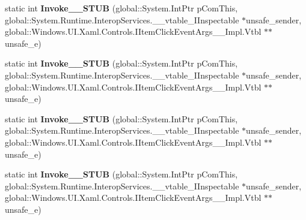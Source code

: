 \begin{DoxyCompactItemize}
\item 
\mbox{\label{struct_windows_1_1_u_i_1_1_xaml_1_1_controls_1_1_item_click_event_handler_____impl_1_1_vtbl_adfcdf0da029e56f3f474a6e2beca6f9c}} 
static int {\bfseries Invoke\+\_\+\+\_\+\+S\+T\+UB} (global\+::\+System.\+Int\+Ptr p\+Com\+This, global\+::\+System.\+Runtime.\+Interop\+Services.\+\_\+\+\_\+vtable\+\_\+\+I\+Inspectable $\ast$unsafe\+\_\+sender, global\+::\+Windows.\+U\+I.\+Xaml.\+Controls.\+I\+Item\+Click\+Event\+Args\+\_\+\+\_\+\+Impl.\+Vtbl $\ast$$\ast$unsafe\+\_\+e)
\item 
\mbox{\label{struct_windows_1_1_u_i_1_1_xaml_1_1_controls_1_1_item_click_event_handler_____impl_1_1_vtbl_adfcdf0da029e56f3f474a6e2beca6f9c}} 
static int {\bfseries Invoke\+\_\+\+\_\+\+S\+T\+UB} (global\+::\+System.\+Int\+Ptr p\+Com\+This, global\+::\+System.\+Runtime.\+Interop\+Services.\+\_\+\+\_\+vtable\+\_\+\+I\+Inspectable $\ast$unsafe\+\_\+sender, global\+::\+Windows.\+U\+I.\+Xaml.\+Controls.\+I\+Item\+Click\+Event\+Args\+\_\+\+\_\+\+Impl.\+Vtbl $\ast$$\ast$unsafe\+\_\+e)
\item 
\mbox{\label{struct_windows_1_1_u_i_1_1_xaml_1_1_controls_1_1_item_click_event_handler_____impl_1_1_vtbl_adfcdf0da029e56f3f474a6e2beca6f9c}} 
static int {\bfseries Invoke\+\_\+\+\_\+\+S\+T\+UB} (global\+::\+System.\+Int\+Ptr p\+Com\+This, global\+::\+System.\+Runtime.\+Interop\+Services.\+\_\+\+\_\+vtable\+\_\+\+I\+Inspectable $\ast$unsafe\+\_\+sender, global\+::\+Windows.\+U\+I.\+Xaml.\+Controls.\+I\+Item\+Click\+Event\+Args\+\_\+\+\_\+\+Impl.\+Vtbl $\ast$$\ast$unsafe\+\_\+e)
\item 
\mbox{\label{struct_windows_1_1_u_i_1_1_xaml_1_1_controls_1_1_item_click_event_handler_____impl_1_1_vtbl_adfcdf0da029e56f3f474a6e2beca6f9c}} 
static int {\bfseries Invoke\+\_\+\+\_\+\+S\+T\+UB} (global\+::\+System.\+Int\+Ptr p\+Com\+This, global\+::\+System.\+Runtime.\+Interop\+Services.\+\_\+\+\_\+vtable\+\_\+\+I\+Inspectable $\ast$unsafe\+\_\+sender, global\+::\+Windows.\+U\+I.\+Xaml.\+Controls.\+I\+Item\+Click\+Event\+Args\+\_\+\+\_\+\+Impl.\+Vtbl $\ast$$\ast$unsafe\+\_\+e)

\end{DoxyCompactItemize}
